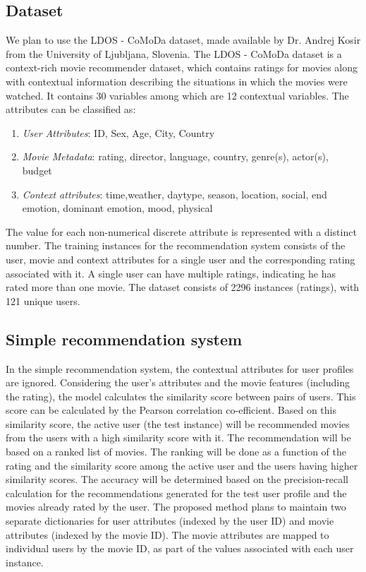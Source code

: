 \documentclass{article}
\begin{document}
\subsection{Dataset}
We plan to use the LDOS - CoMoDa \cite{kovsir2011database} dataset, made available by Dr. Andrej Kosir from the University of Ljubljana, Slovenia. The LDOS - CoMoDa dataset is a context-rich movie recommender dataset, which contains ratings for movies along with contextual information describing the situations in which the movies were watched. 
It contains 30 variables among which are 12 contextual variables. The attributes can be classified as:
\begin{enumerate}
\item \emph{User Attributes}: ID, Sex, Age, City, Country
\item \emph{Movie Metadata}: rating, director, language, country, genre(s), actor(s), budget
\item \emph{Context attributes}: time,weather, daytype, season, location, social, end emotion, dominant emotion, mood, physical
\end{enumerate}
The value for each non-numerical discrete attribute is represented with a distinct number. The training instances for the recommendation system consists of the user, movie and context attributes for a single user and the corresponding rating associated with it. A single user can have multiple ratings, indicating he has rated more than one movie. The dataset consists of 2296 instances (ratings), with 121 unique users. 

\subsection{Simple recommendation system}
In the simple recommendation system, the contextual attributes for user profiles are ignored. Considering the user's attributes and the movie features (including the rating), the model calculates the similarity score between pairs of users. This score can be calculated by the Pearson correlation co-efficient. Based on this similarity score, the active user (the test instance) will be recommended movies from the users with a high similarity score with it. The recommendation will be based on a ranked list of movies. The ranking will be done as a function of the rating and the similarity score among the active user and the users having higher similarity scores. The accuracy will be determined based on the precision-recall calculation for the recommendations generated for the test user profile and the movies already rated by the user. 
The proposed method plans to maintain two separate dictionaries for user attributes (indexed by the user ID) and movie attributes (indexed by the movie ID). The movie attributes are mapped to individual users by the movie ID, as part of the values associated with each user instance.
\end{document}
